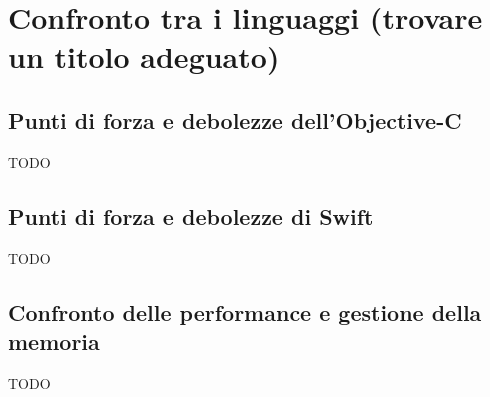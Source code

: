\chapter{Confronto tra i linguaggi (trovare un titolo adeguato)}

\section{Punti di forza e debolezze dell'Objective-C}
TODO
\section{Punti di forza e debolezze di Swift}
TODO
\section{Confronto delle performance e gestione della memoria}
TODO
